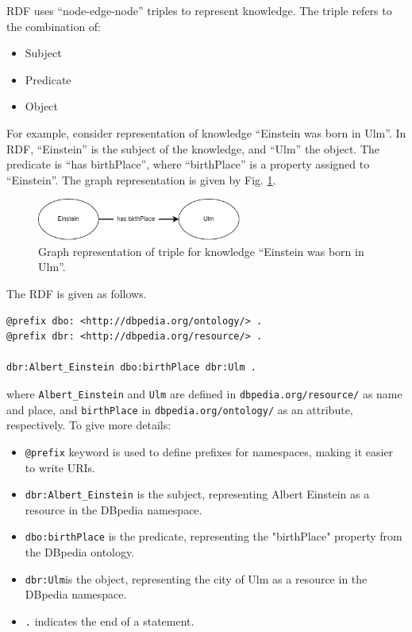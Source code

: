 RDF uses ``node-edge-node'' triples to represent knowledge. The triple refers to the combination of: 
\begin{itemize}
  \item Subject
  \item Predicate
  \item Object
\end{itemize}
For example, consider representation of knowledge ``Einstein was born in Ulm''. In RDF, ``Einstein'' is the subject of the knowledge, and ``Ulm'' the object. The predicate is ``has birthPlace'', where ``birthPlace'' is a property assigned to ``Einstein''. The graph representation is given by Fig. \ref{fig:einsteinexp}.
\begin{figure}[htbp]
	\centering
	\includegraphics[width=0.6\textwidth]{./chapters/ch-semanticwebarchitecture/figures/einsteinexp.png}
	\caption{Graph representation of triple for knowledge ``Einstein was born in Ulm''.}
	\label{fig:einsteinexp}
\end{figure} 
The RDF is given as follows.
\begin{lstlisting}
@prefix dbo: <http://dbpedia.org/ontology/> .
@prefix dbr: <http://dbpedia.org/resource/> .

dbr:Albert_Einstein dbo:birthPlace dbr:Ulm .
\end{lstlisting}
where \verb|Albert_Einstein| and \verb|Ulm| are defined in \verb|dbpedia.org/resource/| as name and place, and \verb|birthPlace| in \verb|dbpedia.org/ontology/| as an attribute, respectively. To give more details:
\begin{itemize}
  \item \verb|@prefix| keyword is used to define prefixes for namespaces, making it easier to write URIs.
  \item \verb|dbr:Albert_Einstein| is the subject, representing Albert Einstein as a resource in the DBpedia namespace.
  \item \verb|dbo:birthPlace| is the predicate, representing the "birthPlace" property from the DBpedia ontology.
  \item \verb|dbr:Ulm|is the object, representing the city of Ulm as a resource in the DBpedia namespace.
  \item \verb|.| indicates the end of a statement.
\end{itemize}

